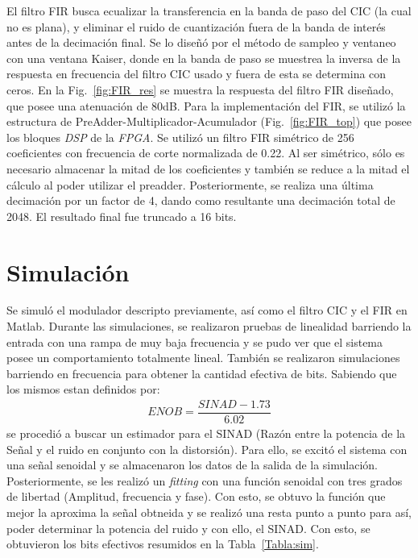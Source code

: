 \documentclass[a4paper,conference]{IEEEtran}
\begin{document}
El filtro FIR busca ecualizar la transferencia en la banda de paso del CIC (la cual no es plana), y eliminar el ruido de cuantizaci\'on fuera de la banda de interés antes de la 
decimaci\'on final. Se lo dise\~n\'o por el m\'etodo de sampleo y ventaneo con una ventana Kaiser, donde en la banda de paso se muestrea la inversa de la respuesta en frecuencia del filtro CIC usado y fuera de esta se determina con ceros\cite{FIR_Comp}. En la Fig.~\ref{fig:FIR_res} se muestra la respuesta del filtro FIR diseñado, que posee una atenuaci\'on de 80dB.
Para la implementación del FIR, se utiliz\'o la estructura de PreAdder-Multiplicador-Acumulador (Fig.~\ref{fig:FIR_top}) que posee los bloques \textit{DSP} de la \textit{FPGA}\cite{Sp6-DSP}. Se utiliz\'o un filtro FIR sim\'etrico de 256 coeficientes  con frecuencia de corte normalizada de 0.22. Al ser sim\'etrico, s\'olo es necesario almacenar la mitad de los coeficientes y tambi\'en se reduce a la mitad el c\'alculo al poder utilizar el preadder.  Posteriormente, se realiza una \'ultima decimaci\'on por un factor de 4, dando como resultante una decimaci\'on total de 2048. El resultado final fue truncado a 16 bits.




\section{Simulaci\'on}
Se simul\'o el modulador descripto previamente, as\'i como el filtro CIC y el FIR en Matlab\textregistered.
Durante las simulaciones, se realizaron pruebas de linealidad barriendo la entrada con una rampa de muy baja frecuencia y se pudo ver que el sistema posee un comportamiento totalmente lineal.
Tambi\'en se realizaron simulaciones barriendo en frecuencia para obtener la cantidad efectiva de bits. Sabiendo que los mismos estan definidos por: 
\begin{align}
ENOB = \dfrac{SINAD-1.73}{6.02}
\end{align}
se procedió a buscar un estimador para el SINAD (Razón entre la potencia de la Se\~nal y el ruido en conjunto con la distorsi\'on). Para ello, se excitó el sistema con una señal senoidal y se almacenaron los datos de la salida de la simulación. Posteriormente, se les realizó un \textit{fitting} con una función senoidal con tres grados de libertad (Amplitud, frecuencia y fase). Con esto, se obtuvo la función que mejor la aproxima la señal obtneida y se realizó una resta punto a punto para así, poder determinar la potencia del ruido y con ello, el SINAD. Con esto, se obtuvieron los bits efectivos resumidos en la Tabla~\ref{Tabla:sim}.
\end{document}
